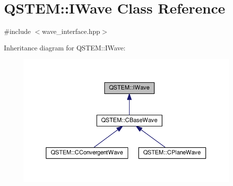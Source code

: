 \hypertarget{class_q_s_t_e_m_1_1_i_wave}{\section{Q\-S\-T\-E\-M\-:\-:I\-Wave Class Reference}
\label{class_q_s_t_e_m_1_1_i_wave}
}


{\ttfamily \#include $<$wave\-\_\-interface.\-hpp$>$}



Inheritance diagram for Q\-S\-T\-E\-M\-:\-:I\-Wave\-:
\nopagebreak
\begin{figure}[H]
\begin{center}
\leavevmode
\includegraphics[width=350pt]{class_q_s_t_e_m_1_1_i_wave__inherit__graph}
\end{center}
\end{figure}
